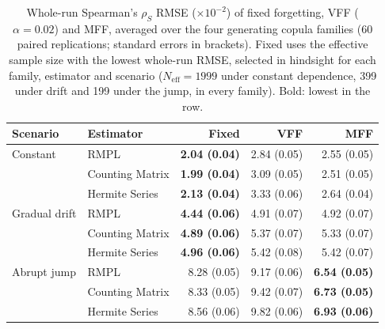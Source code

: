 \begin{table}[htbp]
\centering
\caption{Whole-run Spearman's $\rho_S$ RMSE ($\times10^{-2}$) of fixed forgetting, VFF ($\alpha=0.02$) and MFF, averaged over the four generating copula families (60 paired replications; standard errors in brackets). Fixed uses the effective sample size with the lowest whole-run RMSE, selected in hindsight for each family, estimator and scenario ($N_{\mathrm{eff}}=1999$ under constant dependence, 399 under drift and 199 under the jump, in every family). Bold: lowest in the row.}
\label{tab:strategy-rmse}
\begin{tabular}{llrrr}
\toprule
Scenario & Estimator & Fixed & VFF & MFF \\
\midrule
Constant & RMPL & \textbf{2.04 (0.04)} & 2.84 (0.05) & 2.55 (0.05) \\
 & Counting Matrix & \textbf{1.99 (0.04)} & 3.09 (0.05) & 2.51 (0.05) \\
 & Hermite Series & \textbf{2.13 (0.04)} & 3.33 (0.06) & 2.64 (0.04) \\
\addlinespace
Gradual drift & RMPL & \textbf{4.44 (0.06)} & 4.91 (0.07) & 4.92 (0.07) \\
 & Counting Matrix & \textbf{4.89 (0.06)} & 5.37 (0.07) & 5.33 (0.07) \\
 & Hermite Series & \textbf{4.96 (0.06)} & 5.42 (0.08) & 5.42 (0.07) \\
\addlinespace
Abrupt jump & RMPL & 8.28 (0.05) & 9.17 (0.06) & \textbf{6.54 (0.05)} \\
 & Counting Matrix & 8.33 (0.05) & 9.42 (0.07) & \textbf{6.73 (0.05)} \\
 & Hermite Series & 8.56 (0.06) & 9.82 (0.06) & \textbf{6.93 (0.06)} \\
\bottomrule
\end{tabular}
\end{table}
